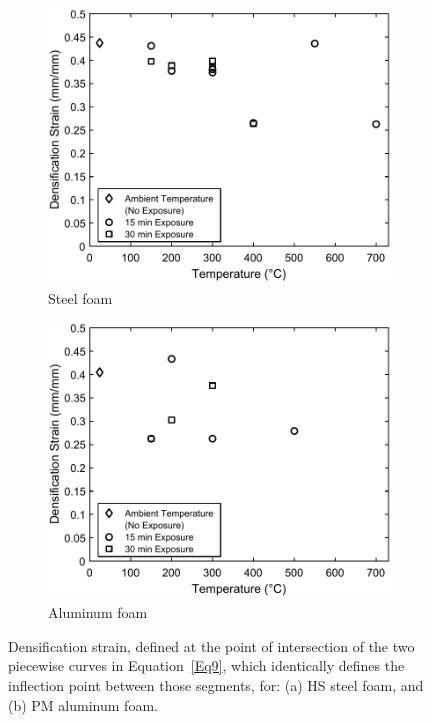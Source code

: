 \documentclass[review]{elsarticle}
\begin{document}
\begin{figure}
	\centering
	\begin{subfigure}{0.50\textwidth}
		\centering
		\includegraphics[width=0.90\linewidth]
		{Tex-Figures/Fig19a-densification-Fe.pdf}
		\caption{Steel foam}
		\label{fig:densification_Steel}
	\end{subfigure}%
	\begin{subfigure}{0.50\textwidth}
		\centering
		\includegraphics[width=0.90\linewidth]
		{Tex-Figures/Fig19b-densification-Al.pdf}
		\caption{Aluminum foam}
		\label{fig:densifiation_Al}
	\end{subfigure}
	\caption{ Densification strain, defined at the point of intersection of the two piecewise curves in Equation~\ref{Eq9}, which identically defines the inflection point between those segments, for: (a) HS steel foam, and (b) PM aluminum foam.}
	\label{fig:densification-modulus}
\end{figure}
\end{document}
